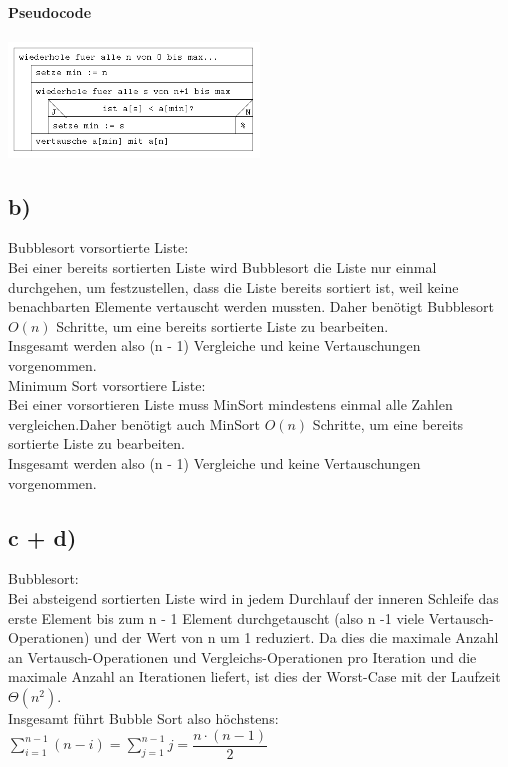 \documentclass[enabledeprecatedfontcommands, a4paper]{scrartcl}
\begin{document}
\textbf{Pseudocode}\\
\\
\includegraphics[width=0.50\textwidth]{Bild1}\\
\newpage
\subsection*{b)}
Bubblesort vorsortierte Liste:\\
Bei einer bereits sortierten Liste wird Bubblesort die Liste nur einmal durchgehen, um festzustellen, dass die Liste bereits sortiert ist, weil keine benachbarten Elemente vertauscht werden mussten. Daher benötigt Bubblesort   ${O}(n)$  Schritte, um eine bereits sortierte Liste zu bearbeiten.\\
Insgesamt werden also (n - 1) Vergleiche und keine Vertauschungen vorgenommen.\\
\newline
Minimum Sort vorsortiere Liste:\\
Bei einer vorsortieren Liste muss MinSort mindestens einmal alle Zahlen vergleichen.Daher benötigt auch MinSort   ${O}(n)$  Schritte, um eine bereits sortierte Liste zu bearbeiten.\\
Insgesamt werden also (n - 1) Vergleiche und keine Vertauschungen vorgenommen.\\
\newpage
\subsection*{c + d)}
Bubblesort:\\
Bei absteigend sortierten Liste wird in jedem Durchlauf der inneren Schleife das erste Element bis zum n - 1 Element durchgetauscht (also n -1 viele  Vertausch-Operationen) und der Wert von n um 1 reduziert. Da dies die maximale Anzahl an Vertausch-Operationen und Vergleichs-Operationen pro Iteration und die maximale Anzahl an Iterationen liefert, ist dies der Worst-Case mit der Laufzeit $\Theta(n^{2})$.\\

Insgesamt führt Bubble Sort also höchstens:\\

$\sum_{i=1}^{n-1} (n-i) = \sum_{j=1}^{n-1} j = \dfrac{n \cdot (n-1)}{2}$\\
\end{document}
